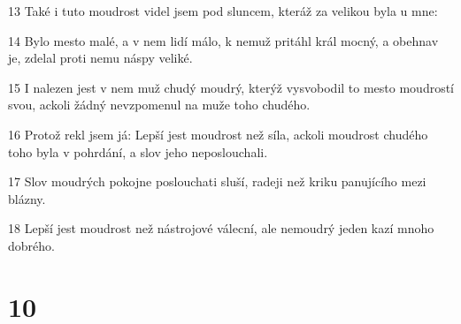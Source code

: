 \par 13 Také i tuto moudrost videl jsem pod sluncem, kteráž za velikou byla u mne:
\par 14 Bylo mesto malé, a v nem lidí málo, k nemuž pritáhl král mocný, a obehnav je, zdelal proti nemu náspy veliké.
\par 15 I nalezen jest v nem muž chudý moudrý, kterýž vysvobodil to mesto moudrostí svou, ackoli žádný nevzpomenul na muže toho chudého.
\par 16 Protož rekl jsem já: Lepší jest moudrost než síla, ackoli moudrost chudého toho byla v pohrdání, a slov jeho neposlouchali.
\par 17 Slov moudrých pokojne poslouchati sluší, radeji než kriku panujícího mezi blázny.
\par 18 Lepší jest moudrost než nástrojové válecní, ale nemoudrý jeden kazí mnoho dobrého.

\chapter{10}

